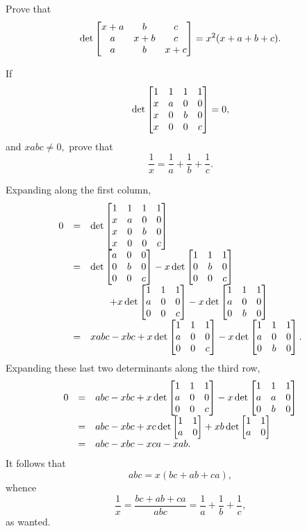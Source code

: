 \begin{pro}
Prove that
$$\det \begin{bmatrix} x+a & b & c  \cr a & x+b & c \cr a & b & x+c
\cr
\end{bmatrix} = x^2(x+a+b+c). $$
\end{pro}
\begin{pro}
If
$$ \det\begin{bmatrix} 1 & 1 & 1 & 1 \cr x & a & 0 & 0 \cr
x & 0 & b & 0 \cr x & 0 & 0 & c\cr \end{bmatrix}  = 0, $$ and
$xabc\neq 0,$ prove that $$ \frac{1}{x} = \frac{1}{a} + \frac{1}{b}
+ \frac{1}{c}.  $$ \begin{answer} Expanding along the first column,
$$\begin{array}{lll} 0 & = &  \det\begin{bmatrix} 1 & 1 & 1 & 1 \cr x & a & 0 & 0 \cr
x & 0 & b & 0 \cr x & 0 & 0 & c\cr \end{bmatrix} \\
& = & \det\begin{bmatrix}a & 0 & 0 \cr 0 & b & 0 \cr 0 & 0 & c \cr
\end{bmatrix} - x\det\begin{bmatrix} 1 & 1 & 1 \cr 0 & b & 0 \cr 0
& 0 & c \cr \end{bmatrix} \\ & & \qquad  + x\det\begin{bmatrix}1 &
1 & 1 \cr a & 0 & 0 \cr 0 & 0 & c \cr  \end{bmatrix}
- x\det\begin{bmatrix} 1 & 1 & 1 \cr a & 0 & 0 \cr  0 & b & 0 \cr \end{bmatrix} \\
& = & xabc - xbc + x\det\begin{bmatrix}1 & 1 & 1 \cr a & 0 & 0 \cr
0 & 0 & c \cr  \end{bmatrix} - x\det\begin{bmatrix} 1 & 1 & 1 \cr
a & 0 & 0 \cr  0 & b & 0 \cr \end{bmatrix}.\\ \end{array}$$
Expanding these  last  two determinants along the third row,
$$\begin{array}{lll} 0 & = & abc - xbc
+ x\det\begin{bmatrix}1 & 1 & 1 \cr a & 0 & 0 \cr 0 & 0 & c \cr
\end{bmatrix}
- x\det\begin{bmatrix} 1 & 1 & 1 \cr a & a & 0 \cr  0 & b & 0 \cr \end{bmatrix}\\
& = &   abc - xbc + xc\det \begin{bmatrix} 1 & 1 \cr  a & 0 \cr\end{bmatrix}  + xb\det \begin{bmatrix} 1 & 1 \cr  a & 0 \cr\end{bmatrix} \\
& = & abc - xbc - xca -xab.
     \end{array}$$It follows that $$abc = x(bc + ab + ca), $$whence$$\frac{1}{x} = \frac{bc + ab + ca}{abc} = \frac{1}{a} +\frac{1}{b} + \frac{1}{c},  $$as wanted.


\end{answer}
\end{pro}
